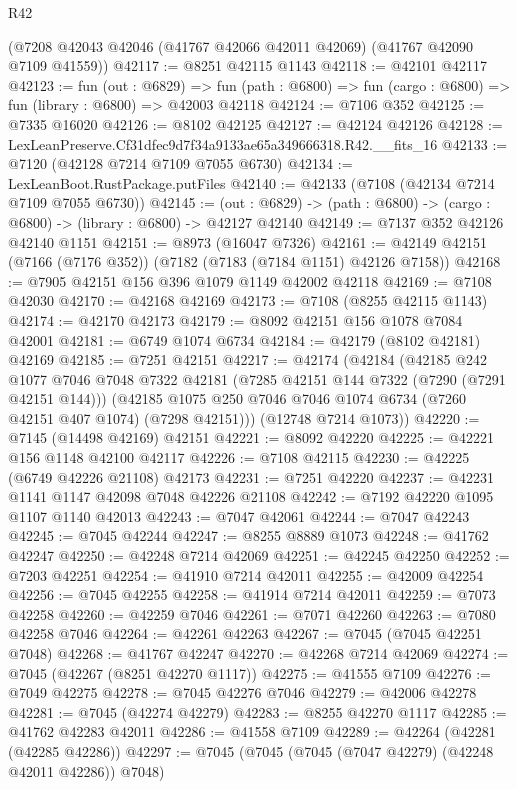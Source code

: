 \begin{lexlean}{R42}
\begin{coremodule}
{    (@7208 @42043 @42046 (@41767 @42066 @42011 @42069) (@41767 @42090 @7109 @41559))
@42117 := @8251 @42115 @1143
@42118 := @42101 @42117
@42123 := fun (out : @6829) =>
  fun (path : @6800) => fun (cargo : @6800) => fun (library : @6800) => @42003 @42118
@42124 := @7106 @352
@42125 := @7335 @16020
@42126 := @8102 @42125
@42127 := @42124 @42126
@42128 := LexLeanPreserve.Cf31dfec9d7f34a9133ae65a349666318.R42.__fits_16
@42133 := @7120 (@42128 @7214 @7109 @7055 @6730)
@42134 := LexLeanBoot.RustPackage.putFiles
@42140 := @42133 (@7108 (@42134 @7214 @7109 @7055 @6730))
@42145 := (out : @6829) -> (path : @6800) -> (cargo : @6800) -> (library : @6800) -> @42127 @42140
@42149 := @7137 @352 @42126 @42140 @1151
@42151 := @8973 (@16047 @7326)
@42161 := @42149 @42151 (@7166 (@7176 @352)) (@7182 (@7183 (@7184 @1151) @42126 @7158))
@42168 := @7905 @42151 @156 @396 @1079 @1149 @42002 @42118
@42169 := @7108 @42030
@42170 := @42168 @42169
@42173 := @7108 (@8255 @42115 @1143)
@42174 := @42170 @42173
@42179 := @8092 @42151 @156 @1078 @7084 @42001
@42181 := @6749 @1074 @6734
@42184 := @42179 (@8102 @42181) @42169
@42185 := @7251 @42151
@42217 := @42174
    (@42184
      (@42185
        @242
        @1077
        @7046
        @7048
        @7322
        @42181
        (@7285 @42151 @144 @7322 (@7290 (@7291 @42151 @144)))
        (@42185 @1075 @250 @7046 @7046 @1074 @6734 (@7260 @42151 @407 @1074) (@7298 @42151)))
      (@12748 @7214 @1073))
@42220 := @7145 (@14498 @42169) @42151
@42221 := @8092 @42220
@42225 := @42221 @156 @1148 @42100 @42117
@42226 := @7108 @42115
@42230 := @42225 (@6749 @42226 @21108) @42173
@42231 := @7251 @42220
@42237 := @42231 @1141 @1147 @42098 @7048 @42226 @21108
@42242 := @7192 @42220 @1095 @1107 @1140 @42013
@42243 := @7047 @42061
@42244 := @7047 @42243
@42245 := @7045 @42244
@42247 := @8255 @8889 @1073
@42248 := @41762 @42247
@42250 := @42248 @7214 @42069
@42251 := @42245 @42250
@42252 := @7203 @42251
@42254 := @41910 @7214 @42011
@42255 := @42009 @42254
@42256 := @7045 @42255
@42258 := @41914 @7214 @42011
@42259 := @7073 @42258
@42260 := @42259 @7046
@42261 := @7071 @42260
@42263 := @7080 @42258 @7046
@42264 := @42261 @42263
@42267 := @7045 (@7045 @42251 @7048)
@42268 := @41767 @42247
@42270 := @42268 @7214 @42069
@42274 := @7045 (@42267 (@8251 @42270 @1117))
@42275 := @41555 @7109
@42276 := @7049 @42275
@42278 := @7045 @42276 @7046
@42279 := @42006 @42278
@42281 := @7045 (@42274 @42279)
@42283 := @8255 @42270 @1117
@42285 := @41762 @42283 @42011
@42286 := @41558 @7109
@42289 := @42264 (@42281 (@42285 @42286))
@42297 := @7045 (@7045 (@7045 (@7047 @42279) (@42248 @42011 @42286)) @7048)
}
\end{coremodule}
\end{lexlean}
